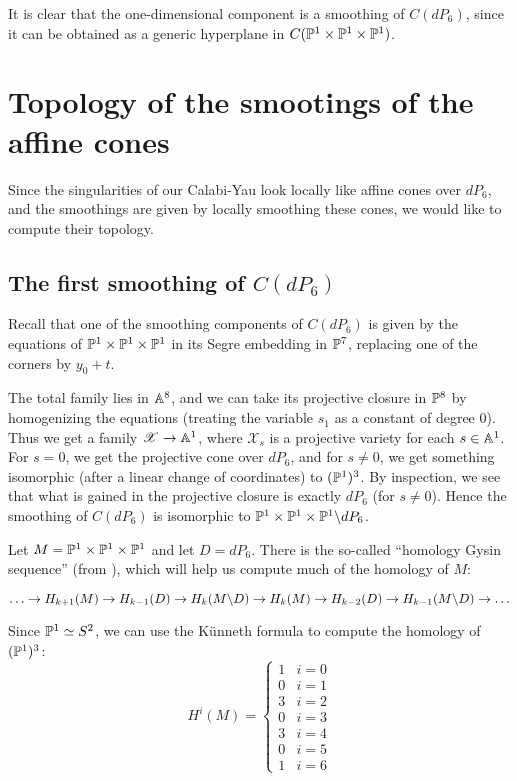 \documentclass[11pt, english]{article}
\begin{document}
It is clear that the one-dimensional component is a smoothing of $C(dP_6)$, since it can be obtained as a generic hyperplane in $C(\mathbb{P}^1 \times \mathbb{P}^1 \times \mathbb{P}^1)$.

\section{Topology of the smootings of the affine cones}

Since the singularities of our Calabi-Yau look locally like affine cones over $dP_6$, and the smoothings are given by locally smoothing these cones, we would like to compute their topology. 

\subsection{The first smoothing of $C(dP_6)$}

Recall that one of the smoothing components of $C(dP_6)$ is given by the equations of $\mathbb{P}^1 \times \mathbb{P}^1 \times \mathbb{P}^1$ in its Segre embedding in $\mathbb{P}^7$, replacing one of the corners by $y_0+t$.

The total family lies in $\mathbb{A}^8$, and we can take its projective closure in $\mathbb{P}^8$ by homogenizing the equations (treating the variable $s_1$ as a constant of degree $0$). Thus we get a family $\mathscr X \to \mathbb{A}^1$, where $\mathscr X_s$ is a projective variety for each $s \in \mathbb{A}^1$. For $s=0$, we get the projective cone over $dP_6$, and for $s \neq 0$, we get something isomorphic (after a linear change of coordinates) to $(\mathbb{P}^1)^3$. By inspection, we see that what is gained in the projective closure is exactly $dP_6$ (for $s \neq 0$). Hence the smoothing of $C(dP_6)$ is isomorphic to $\mathbb{P}^1 \times \mathbb{P}^1 \times \mathbb{P}^1 \backslash dP_6$.

Let $M = \mathbb{P}^1 \times \mathbb{P}^1 \times \mathbb{P}^1$ and let $D=dP_6$. There is the so-called ``homology Gysin sequence'' (from \cite{dimca_singularities}), which will help us compute much of the homology of $M$:

\[
\ldots \to H_{k+1}(M) \to H_{k-1}(D) \to H_k(M \backslash D) \to H_k(M) \to H_{k-2}(D) \to H_{k-1}(M \backslash D) \to \ldots 
\]

Since $\mathbb{P}^1 \simeq S^2$, we can use the Künneth formula to compute the homology of $(\mathbb{P}^1)^3$: 
\[
H^i(M) = \begin{cases}
1 & i = 0 \\
0 & i = 1 \\
3 & i = 2 \\
0 & i = 3 \\
3 & i = 4 \\
0 & i = 5 \\
1 & i = 6
\end{cases}
\]
\end{document}
